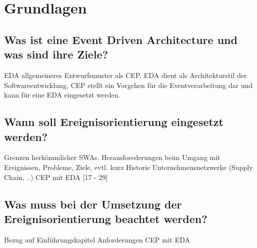 \chapter{Grundlagen}

\section{Was ist eine Event Driven Architecture und was sind ihre Ziele?}

EDA allgemeineres Entwurfsmuster als CEP. EDA dient als Architekturstil der Softwareentwicklung, CEP stellt ein Vorgehen für die Eventverarbeitung dar und kann für eine EDA eingesetzt werden.
\cite[]{bruns2010event}

\section{Wann soll Ereignisorientierung eingesetzt werden?}

Grenzen herkömmlicher SWAs.
Herausforederungen beim Umgang mit Ereignissen, Probleme, Ziele, evtl. kurz Historie
Unternehmensnetzwerke (Supply Chain, ..)
CEP mit EDA
\cite{EsperRef2018}[17 - 29]

\section{Was muss bei der Umsetzung der Ereignisorientierung beachtet werden?}

Bezug auf Einführungskapitel Anforderungen
CEP mit EDA
